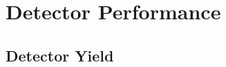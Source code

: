 \chapter{Detector Performance}
\label{detector_performance_chapter}

\section{Detector Yield}
\label{sec:yield}


